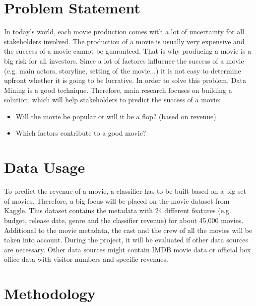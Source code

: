 

 
\section{Problem Statement}
 In today's world, each movie production comes with a lot of uncertainty for all stakeholders involved. The production of a movie is usually very expensive and the success of a movie cannot be guaranteed. That is why producing a movie is a big risk for all investors. 
Since a lot of factores influence the success of a movie (e.g. main actors, storyline, setting of the movie...) it is not easy to determine upfront whether it is going to be lucrative.
In order to solve this problem, Data Mining is a good technique. 
Therefore, main research focuses on building a solution, which will help stakeholders to predict the success of a movie:

\begin{itemize}
    \item Will the movie be popular or will it be a flop? (based on revenue)
    \item Which factors contribute to a good movie?
\end{itemize}


\section{Data Usage}
To predict the revenue of a movie, a classifier has to be built based on a big set of movies. Therefore, a big focus will be placed on the movie dataset from Kaggle. This dataset contains the metadata with 24 different features (e.g. budget, release date, genre and the classifier revenue) for about 45,000 movies. Additional to the movie metadata, the cast and the crew of all the movies will be taken into account. During the project, it will be evaluated if other data sources are necessary. Other data sources might contain IMDB movie data or official box office data with visitor numbers and specific revenues.


\section{Methodology}

